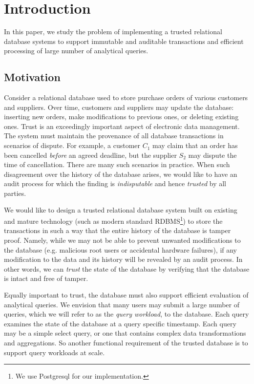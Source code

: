 \section{Introduction}

In this paper, we study the problem of implementing a trusted relational
database systems to support immutable and auditable transactions and efficient
processing of large number of analytical queries.

\subsection{Motivation}

Consider a relational database
used to store purchase orders of various customers and suppliers.  Over time,
customers and suppliers may update the database: inserting new orders, 
make modifications to previous ones, or deleting existing ones.  Trust is an
exceedingly important aspect of electronic data management. The system must
maintain the provenance of all database transactions in scenarios of dispute.
For example, a customer $C_1$ may claim that an order has been cancelled {\em
before} an agreed deadline, but the
supplier $S_2$ may dispute the time of cancellation.  There are many such
scenarios in practice.
When such disagreement over the history
of the database arises, we would like to have an audit process for which the
finding is {\em indisputable} and hence {\em trusted} by all parties.

We would like to design a trusted relational database system built on existing
and mature technology (such as modern standard RDBMS\footnote{We use Postgresql
for our implementation.}) to store the transactions in such a way that the entire history
of the database is tamper proof.  Namely, while we may not be able to prevent
unwanted modifications to the database (e.g. malicious root users 
or accidental hardware failures), if any modification to the data and its history will be
revealed by an audit process.  In other words, we can {\em trust} the
state of the database by verifying that the database is intact and free of tamper.

Equally important to trust, the database must also support efficient evaluation
of analytical queries.  We envision that many users may submit a large number of
queries, which we will refer to as the {\em query workload}, to the database.  Each
query examines the state of the database at a query specific timestamp.  
Each query may be a simple select query, or one that contains complex data
transformations and aggregations.  So another
functional requirement of the trusted database is to support 
query workloads at scale.

